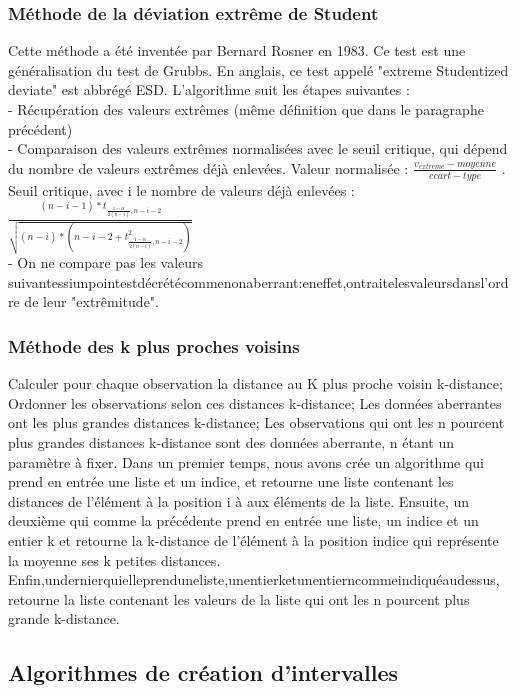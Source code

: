\documentclass[a4paper,12pt]{article} %
\begin{document}
\subsubsection{Méthode de la déviation extrême de Student}
Cette méthode a été inventée par Bernard Rosner en 1983. Ce test est une généralisation du test de Grubbs. En anglais, ce test appelé "extreme Studentized deviate" est abbrégé ESD. L’algorithme suit les étapes suivantes : \\
- Récupération des valeurs extrêmes (même déﬁnition que dans le paragraphe précédent)\\
- Comparaison des valeurs extrêmes normalisées avec le seuil critique, qui dépend du nombre de valeurs extrêmes déjà enlevées. Valeur normalisée : $\frac{v_{extreme}-moyenne}{ecart-type}$ . Seuil critique, avec i le nombre de valeurs déjà enlevées : 
$\frac{    (n-i-1)*t _{     \frac{1-\alpha}{2(n-i)},n-i-2     }       }  {        \sqrt{       (n-i)*(n-i-2+t^2_{   \frac{1-\alpha}{2(n-i)},n-i-2} )      }     }  $ \\
 - On ne compare pas les valeurs suivantessiunpointestdécrétécommenonaberrant:eneﬀet,ontraitelesvaleursdansl’ordre de leur "extrêmitude".

\subsubsection{Méthode des k plus proches voisins}

Calculer pour chaque observation la distance au K plus proche voisin k-distance; Ordonner les observations selon ces distances k-distance; Les données aberrantes ont les plus grandes distances k-distance; Les observations qui ont les n pourcent plus grandes distances k-distance sont des données aberrante, n étant un paramètre à ﬁxer. Dans un premier temps, nous avons crée un algorithme qui prend en entrée une liste et un indice, et retourne une liste contenant les distances de l’élément à la position i à aux éléments de la liste. Ensuite, un deuxième qui comme la précédente prend en entrée une liste, un indice et un entier k et retourne la k-distance de l’élément à la position indice qui représente la moyenne ses k petites distances. Enﬁn,undernierquielleprenduneliste,unentierketunentierncommeindiquéaudessus, retourne la liste contenant les valeurs de la liste qui ont les n pourcent plus grande k-distance.

\subsection{Algorithmes de création d'intervalles}
\end{document}
